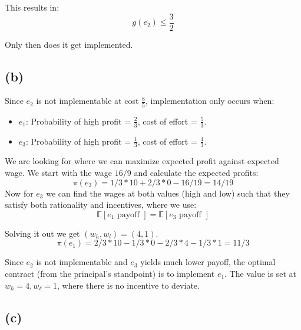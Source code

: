 \documentclass{article}
\begin{document}
This results in:
\[
g(e_2) \leq \frac{3}{2}

\]

Only then does it get implemented. 

\subsection*{(b)}

Since \( e_{2} \) is not implementable at cost \( \frac{8}{5}\), implementation only occurs when: 
\begin{itemize}
    \item \( e_{1} \): Probability of high profit = \( \frac{2}{3} \), cost of effort = \( \frac{5}{3} \).
    \item \( e_{3} \): Probability of high profit = \( \frac{1}{3} \), cost of effort = \( \frac{4}{3}  \).
\end{itemize}

We are looking for where we can maximize expected profit against expected wage. We start with the wage $16/9$ and calculate the expected profits: 
\[
\pi(e_3) = 1/3*10 + 2/3*0 - 16/19 = 14/19
\]
Now for $e_3$ we can find the wages at both values (high and low) such that they satisfy both rationality and incentives, where we use: 
\[
\mathbb{E}[e_1 \text{ payoff }] = \mathbb{E}[e_3 \text{ payoff }]
\]

Solving it out we get $(w_h, w_l) = (4,1)$. 
\[
\pi(e_1) = 2/3*10 - 1/3*0 - 2/3*4 - 1/3*1 = 11/3
\]

Since $e_{2}$ is not implementable and $e_{3}$ yields much lower payoff, the optimal contract (from the principal’s standpoint) is to implement $e_{1}$. The value is set at $w_{h}=4, w_{\ell}=1$, where there is no incentive to deviate. 

\subsection*{(c)}
\end{document}
